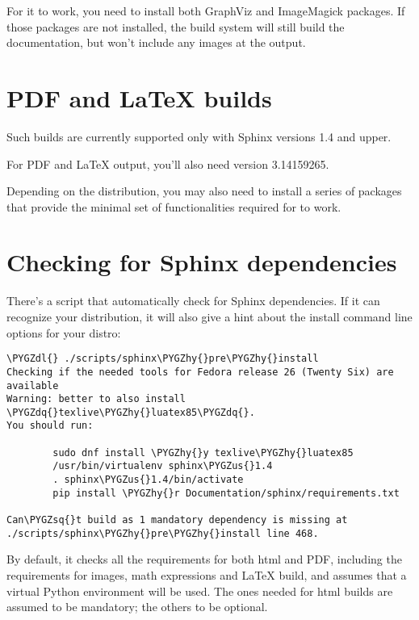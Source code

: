 \documentclass[a4paper,8pt,english]{sphinxmanual}
\def\PYGZus{\char`\_}
\def\PYGZdl{\char`\$}
\def\PYGZhy{\char`\-}
\def\PYGZsq{\char`\'}
\def\PYGZdq{\char`\"}
\renewcommand\PYGZsq{\textquotesingle}
\begin{document}
For it to work, you need to install both GraphViz and ImageMagick
packages. If those packages are not installed, the build system will
still build the documentation, but won't include any images at the
output.


\section{PDF and LaTeX builds}
\label{doc-guide/sphinx:pdf-and-latex-builds}
Such builds are currently supported only with Sphinx versions 1.4 and upper.

For PDF and LaTeX output, you'll also need  version 3.14159265.

Depending on the distribution, you may also need to install a series of
 packages that provide the minimal set of functionalities
required for  to work.


\section{Checking for Sphinx dependencies}
\label{doc-guide/sphinx:checking-for-sphinx-dependencies}\label{doc-guide/sphinx:sphinx-pre-install}
There's a script that automatically check for Sphinx dependencies. If it can
recognize your distribution, it will also give a hint about the install
command line options for your distro:

\begin{Verbatim}[commandchars=\\\{\}]
\PYGZdl{} ./scripts/sphinx\PYGZhy{}pre\PYGZhy{}install
Checking if the needed tools for Fedora release 26 (Twenty Six) are available
Warning: better to also install \PYGZdq{}texlive\PYGZhy{}luatex85\PYGZdq{}.
You should run:

        sudo dnf install \PYGZhy{}y texlive\PYGZhy{}luatex85
        /usr/bin/virtualenv sphinx\PYGZus{}1.4
        . sphinx\PYGZus{}1.4/bin/activate
        pip install \PYGZhy{}r Documentation/sphinx/requirements.txt

Can\PYGZsq{}t build as 1 mandatory dependency is missing at ./scripts/sphinx\PYGZhy{}pre\PYGZhy{}install line 468.
\end{Verbatim}

By default, it checks all the requirements for both html and PDF, including
the requirements for images, math expressions and LaTeX build, and assumes
that a virtual Python environment will be used. The ones needed for html
builds are assumed to be mandatory; the others to be optional.
\end{document}
